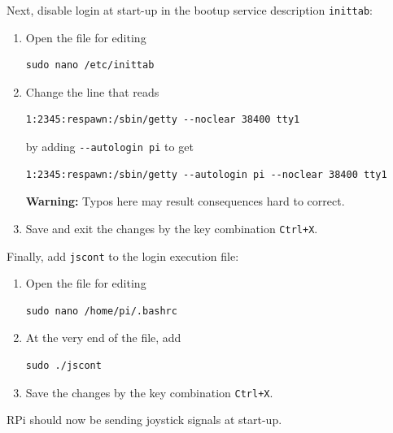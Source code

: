 \documentclass[a4paper,english]{report}
\begin{document}
Next, disable login at start-up in the bootup service description
\texttt{inittab}:
\begin{enumerate}
	\item Open the file for editing \begin{verbatim}sudo nano /etc/inittab\end{verbatim}
	\item Change the line that reads \begin{verbatim}1:2345:respawn:/sbin/getty --noclear 38400 tty1\end{verbatim}
	by adding \texttt{-{}-autologin pi} to get \begin{verbatim}1:2345:respawn:/sbin/getty --autologin pi --noclear 38400 tty1\end{verbatim}
	\textbf{Warning:} Typos here may result consequences hard to correct.
	\item Save and exit the changes by the key combination \texttt{Ctrl+X}.
\end{enumerate}
Finally, add \texttt{jscont} to the login execution file:
\begin{enumerate}
	\item Open the file for editing \begin{verbatim}sudo nano /home/pi/.bashrc\end{verbatim}
	\item At the very end of the file, add \begin{verbatim}sudo ./jscont\end{verbatim}
	\item Save the changes by the key combination \texttt{Ctrl+X}.
\end{enumerate}
RPi should now be sending joystick signals at start-up.

\clearpage


\end{document}
